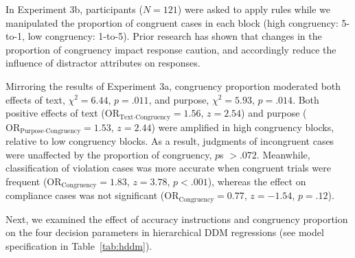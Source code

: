 \documentclass[pdflatex,sn-nature]{sn-jnl}
\begin{document}
In Experiment 3b, participants ($N = 121$) were asked to apply rules while we manipulated the proportion of congruent cases in each block (high congruency: 5-to-1, low congruency: 1-to-5). Prior research has shown that changes in the proportion of congruency impact response caution, and accordingly reduce the influence of distractor attributes on responses\cite{ref19}.

Mirroring the results of Experiment 3a, congruency proportion moderated both effects of text, $\chi^2 = 6.44$, $p = .011$, and purpose, $\chi^2 = 5.93$, $p = .014$. Both positive effects of text ($\mathrm{OR}_{\text{Text}{\cdot}\text{Congruency}} = 1.56$, $z = 2.54$) and purpose ($\mathrm{OR}_{\text{Purpose}{\cdot}\text{Congruency}} = 1.53$, $z = 2.44$) were amplified in high congruency blocks, relative to low congruency blocks. As a result, judgments of incongruent cases were unaffected by the proportion of congruency, $p$s $> .072$. Meanwhile, classification of violation cases was more accurate when congruent trials were frequent ($\mathrm{OR}_\text{Congruency} = 1.83$, $z = 3.78$, $p < .001$), whereas the effect on compliance cases was not significant ($\mathrm{OR}_\text{Congruency} = 0.77$, $z = -1.54$, $p = .12$).

Next, we examined the effect of accuracy instructions and congruency proportion on the four decision parameters in hierarchical DDM regressions (see model specification in Table~\ref{tab:hddm}).
\end{document}
